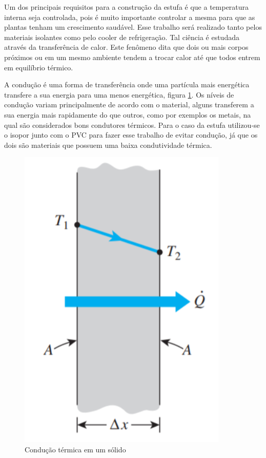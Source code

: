 Um dos principais requisitos para a construção da estufa é que a temperatura interna seja controlada, pois é muito importante controlar a mesma para que as plantas tenham um crescimento saudável. Esse trabalho será realizado tanto pelos materiais isolantes como pelo cooler de refrigeração. Tal ciência é estudada através da transferência de calor. Este fenômeno dita que dois ou mais corpos próximos ou em um mesmo ambiente tendem a trocar calor até que todos entrem em equilíbrio térmico.

A condução é uma forma de transferência onde uma partícula mais energética transfere a sua energia para uma menos energética, figura \ref{fig:conducao_termica}. Os níveis de condução variam principalmente de acordo com o material, alguns transferem a sua energia mais rapidamente do que outros, como por exemplos os metais, na qual são considerados bons condutores térmicos. Para o caso da estufa utilizou-se o isopor junto com o PVC para fazer esse trabalho de evitar condução, já que os dois são materiais que possuem uma baixa condutividade térmica.
\begin{figure}[H]
	\centering
	\includegraphics[width=10cm]{figuras/conducao_termica.png}
	\caption{Condução térmica em um sólido}
	\label{fig:conducao_termica}
\end{figure}

